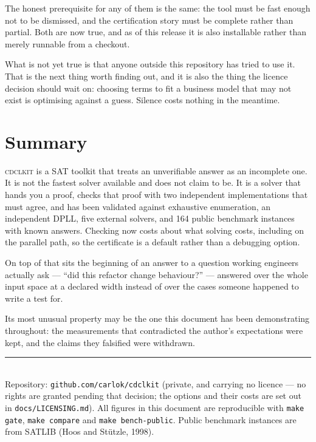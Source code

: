 \documentclass[11pt,a4paper]{article}
\newcommand{\cdclkit}{\textsc{cdclkit}}
\begin{document}
\noindent
The honest prerequisite for any of them is the same: the tool must be fast
enough not to be dismissed, and the certification story must be complete rather
than partial. Both are now true, and as of this release it is also installable
rather than merely runnable from a checkout.

What is not yet true is that anyone outside this repository has tried to use
it. That is the next thing worth finding out, and it is also the thing the
licence decision should wait on: choosing terms to fit a business model that
may not exist is optimising against a guess. Silence costs nothing in the
meantime.

\section{Summary}

\cdclkit{} is a SAT toolkit that treats an unverifiable answer as an incomplete
one. It is not the fastest solver available and does not claim to be. It is a
solver that hands you a proof, checks that proof with two independent
implementations that must agree, and has been validated against exhaustive
enumeration, an independent DPLL, five external solvers, and 164 public
benchmark instances with known answers. Checking now costs about what solving
costs, including on the parallel path, so the certificate is a default rather
than a debugging option.

On top of that sits the beginning of an answer to a question working engineers
actually ask --- ``did this refactor change behaviour?'' --- answered over the
whole input space at a declared width instead of over the cases someone
happened to write a test for.

Its most unusual property may be the one this document has been demonstrating
throughout: the measurements that contradicted the author's expectations were
kept, and the claims they falsified were withdrawn.

\vspace{1em}
\noindent\rule{\linewidth}{0.4pt}\\[4pt]
{\small Repository: \texttt{github.com/carlok/cdclkit} (private, and carrying no
licence --- no rights are granted pending that decision; the options and their
costs are set out in \texttt{docs/LICENSING.md}). All figures in this document
are reproducible with \texttt{make gate}, \texttt{make compare} and
\texttt{make bench-public}. Public benchmark instances are from SATLIB (Hoos
and St\"utzle, 1998).}
\end{document}
